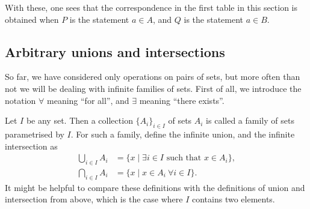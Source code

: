 With these, one sees that the correspondence in the first table in this section is obtained when $P$ is the statement $a \in A$, and $Q$ is the statement $a \in B$.

\subsection{Arbitrary unions and intersections}
So far, we have considered only operations on pairs of sets, but more often than not we will be dealing with infinite families of sets. First of all, we introduce the notation $\forall$ meaning ``for all'', and $\exists$ meaning ``there exists''.

Let $I$ be any set. Then a collection $\{ A_i \}_{i \in I}$ of sets $A_i$ is called a family of sets parametrised by $I$. For such a family, define the infinite union, and the infinite intersection as
\begin{align*}
  \bigcup_{i \in I} A_i &= \{ x \mid \text{$\exists i \in I$ such that $x \in A_i$} \},\\
  \bigcap_{i \in I} A_i &= \{ x \mid \text{$x \in A_i \ \forall i \in I$} \}.
\end{align*}
It might be helpful to compare these definitions with the definitions of union and intersection from above, which is the case where $I$ contains two elements.

